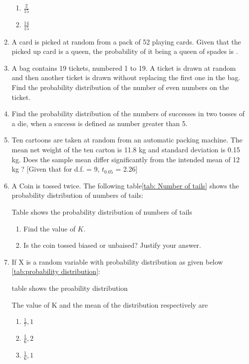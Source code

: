 \begin{enumerate}
\begin{enumerate}
\item $\frac{2}{15}$
\item $\frac{14}{15}$
\end{enumerate}
\item A card is picked at random from a pack of 52 playing cards. Given that the picked up card is a queen, the probability of it being a queen of spades is \underline{\hspace{1cm}}.
\item A bag contains 19 tickets, numbered 1 to 19. A ticket is drawn at random and then another ticket is drawn without replacing the first one in the bag. Find the probability distribution of the number of even numbers on the ticket.
\item Find the probability distribution of the numbers of successes in two tosses of a die, when a success is defined as number greater than 5.
\item Ten cartoons are taken at random from an automatic packing machine. The mean net weight of the ten carton is 11.8 kg and standard deviation is 0.15 kg. Does the sample mean differ significantly from the intended mean of 12 kg ?
[Given that for d.f. = 9, $t_{0.05}$ = 2.26]
\item A Coin is tossed twice. The following table\ref{tab: Number of tails} shows the probability distribution of numbers of tails:
\begin{table}[!ht]
	
\caption{Table shows the probability distribution of numbers of tails \label{tab: Number of tails}}
\end{table}
\begin{enumerate}
\item Find the value of $K$.
\item Is the coin tossed biased or unbaised?
Justify your answer.
\end{enumerate}
\item If X is a random variable with probability distribution as given below \ref{tab:probability distribution}:
\begin{table}[!ht]

\caption{table shows the proability distribution \label{tab:probability distribution}}
\end{table}
\newline The value of K and the mean of the distribution respectively are 
\begin{enumerate}
\item $\frac{1}{7}, 1$
\item $\frac{1}{6}, 2$
\item $\frac{1}{6}, 1$

\end{enumerate}
\end{enumerate}
